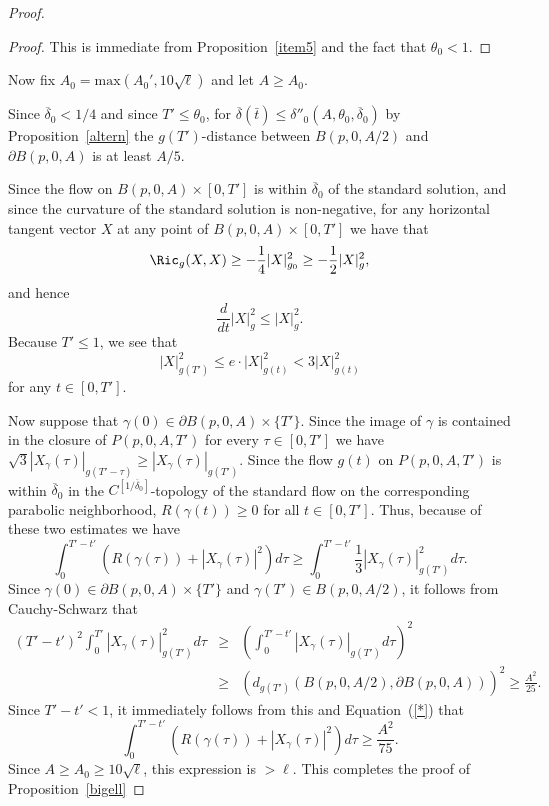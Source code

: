 \begin{proof}
\begin{proof}
This is immediate from Proposition~\ref{item5} and the fact that
$\theta_0<1$.
\end{proof}

Now fix $A_0=\mathrm{max}(A_0', 10\sqrt{\ell})$ and let $A\ge A_0$.


Since $\overline\delta_0<1/4$ and since $T'\le \theta_0$, for $\overline\delta(\bar t)\le
\delta''_0(A,\theta_0,\overline\delta_0)$
by Proposition~\ref{altern}
the $g(T')$-distance  between $B(p,0,A/2)$ and $\partial
B(p,0,A)$  is at least $A/5$.

 Since the
flow on $B(p,0,A)\times[0,T']$ is within $\overline\delta_0$ of
the standard solution, and since the curvature of the standard
solution is non-negative, for any horizontal tangent vector $X$ at
any point of $B(p,0,A)\times [0,T']$ we have that
$$\Ric_g(X,X)\ge -\frac{1}{4}|X|_{g_0}^2\ge -\frac{1}{2}|X|^2_g,$$ and hence
$$\frac{d}{dt}|X|_g^2\le |X|_g^2.$$
Because  $T'\le 1$, we see that
$$|X|^2_{g(T')}\le e\cdot|X|^2_{g(t)}<3|X|^2_{g(t)}$$
for any $t\in [0,T']$.

Now suppose that $\gamma(0)\in \partial B(p,0,A)\times\{T'\}$. Since
the image of $\gamma$ is contained in the closure of $P(p,0,A,T')$
for every $\tau\in [0,T']$ we have
$\sqrt{3}|X_\gamma(\tau)|_{g(T'-\tau)}\ge |X_\gamma(\tau)|_{g(T')}$.
Since the flow $g(t)$ on $P(p,0,A, T')$ is within
$\overline\delta_0$ in the $C^{[1/\overline\delta_0]}$-topology of
the standard flow on the corresponding parabolic neighborhood,
$R(\gamma(t))\ge 0$ for all $t\in [0,T']$. Thus, because of these
two estimates we have
\begin{equation}\label{*}
\int_0^{T'-t'}\left(R(\gamma(\tau))+|X_\gamma(\tau)|^2\right)d\tau\ge
\int_0^{T'-t'}
\frac{1}{3}|X_\gamma(\tau)|_{g(T')}^2d\tau.\end{equation}
 Since $\gamma(0)\in
\partial B(p,0,A)\times \{T'\}$ and $\gamma(T')\in B(p,0,A/2)$, it follows from
Cauchy-Schwarz that
\begin{eqnarray*}(T'-t')^2\int_0^{T'}|X_\gamma(\tau)|_{g(T')}^2d\tau &
\ge & \left(\int_0^{T'-t'}|X_\gamma(\tau)|_{g(T')}d\tau\right)^2
\\
& \ge & \left(d_{g(T')}(B(p,0,A/2),\partial
B(p,0,A))\right)^2\ge \frac{A^2}{25}. \end{eqnarray*}
 Since $T'-t'<1$, it
immediately follows from this and Equation~(\ref{*}) that
$$\int_0^{T'-t'}\left(R(\gamma(\tau))+|X_\gamma(\tau)|^2\right)d\tau\ge
\frac{A^2}{75}.$$ Since $A\ge A_0\ge 10\sqrt{ \ell}$, this
expression is $>\ell$. This completes the proof of
Proposition~\ref{bigell}
\end{proof}








